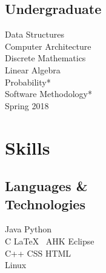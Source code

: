 \documentclass[letterpaper]{deedy-resume} %
\begin{document}
\begin{minipage}[t]{0.33\textwidth}
		
		\subsection{Undergraduate}
		
		Data Structures\\
		Computer Architecture\\
		Discrete Mathematics\\
		Linear Algebra\\
		Probability*\\
		Software Methodology*\\
		
		{\tiny * Spring 2018}
		
		\sectionspace %
		
		
		\section{Skills}
		
		\subsection[Languages & Technologies]{Languages \& \texorpdfstring{\\}{ } Technologies}
		
		Java \textbullet{} Python\\
		C \textbullet{}  \LaTeX\ \textbullet{} AHK \textbullet{} Eclipse\\
		C++ \textbullet{} CSS \textbullet{} HTML \\  \textbullet{} Linux\\
		
		\sectionspace %
		
		
	\end{minipage} %
	\hfill
\end{document}
